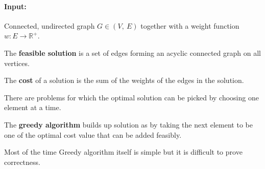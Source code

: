 \paragraph{Input:} Connected, undirected graph $G \in (V,~E)$ together with a 
weight function $w: E \rightarrow \mathbb{R}^+$.

\begin{definition}
 The \textbf{feasible solution} is a set of edges forming an acyclic connected 
graph on all vertices.
\end{definition}

\begin{definition}
 The \textbf{cost} of a solution is the sum of the weights of the edges in the 
solution.
\end{definition}

There are problems for which the optimal solution can be picked by choosing one 
element at a time.

\begin{definition}
The \textbf{greedy algorithm} builds up solution as by taking the next element 
to be one of the optimal cost value that can be added feasibly.
\end{definition}

Most of the time Greedy algorithm itself is simple but it is difficult to prove 
correctness.

